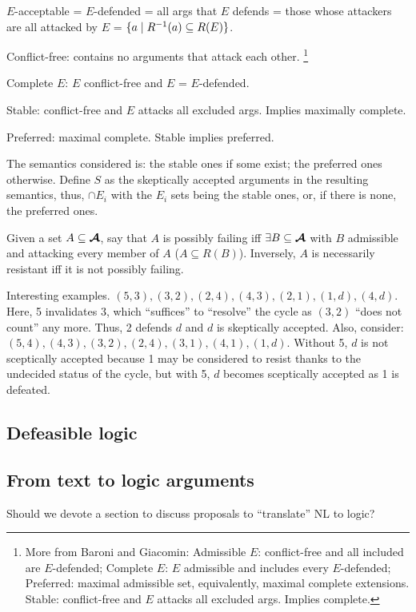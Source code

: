 \documentclass[version=3.21, pagesize, twoside=off, bibliography=totoc, DIV=calc, fontsize=12pt, a4paper, french, english]{scrartcl}
\begin{document}
$E$-acceptable = $E$-defended = all args that $E$ defends = those whose attackers are all attacked by $E$ = $\set{a \suchthat R^{-1}(a)\subseteq R(E)}$.

Conflict-free: contains no arguments that attack each other.
\footnote{More from Baroni and Giacomin: Admissible $E$: conflict-free and all included are $E$-defended; Complete $E$: $E$ admissible and includes every $E$-defended; Preferred: maximal admissible set, equivalently, maximal complete extensions. Stable: conflict-free and $E$ attacks all excluded args. Implies complete.}

Complete $E$: $E$ conflict-free and $E$ = $E$-defended.

Stable: conflict-free and $E$ attacks all excluded args. Implies maximally complete.

Preferred: maximal complete. Stable implies preferred. 

The semantics considered is: the stable ones if some exist; the preferred ones otherwise. Define $S$ as the skeptically accepted arguments in the resulting semantics, thus, $\cap E_i$ with the $E_i$ sets being the stable ones, or, if there is none, the preferred ones.

Given a set $A \subseteq \bm{\mathcal{A}}$, say that $A$ is possibly failing iff $\exists B \subseteq \bm{\mathcal{A}}$ with $B$ admissible and attacking every member of $A$ ($A \subseteq R(B)$).
Inversely, $A$ is necessarily resistant iff it is not possibly failing.

Interesting examples. $(5, 3), (3, 2), (2, 4), (4, 3), (2, 1), (1, d), (4, d)$. Here, 5 invalidates 3, which “suffices” to “resolve” the cycle as $(3, 2)$ “does not count” any more. Thus, 2 defends $d$ and $d$ is skeptically accepted. Also, consider: $(5, 4), (4, 3), (3, 2), (2, 4), (3, 1), (4, 1), (1, d)$. Without 5, $d$ is not sceptically accepted because 1 may be considered to resist thanks to the undecided status of the cycle, but with 5, $d$ becomes sceptically accepted as 1 is defeated.

\subsection{Defeasible logic}

\subsection{From text to logic arguments}
Should we devote a section to discuss proposals to “translate” NL to logic?
\end{document}
